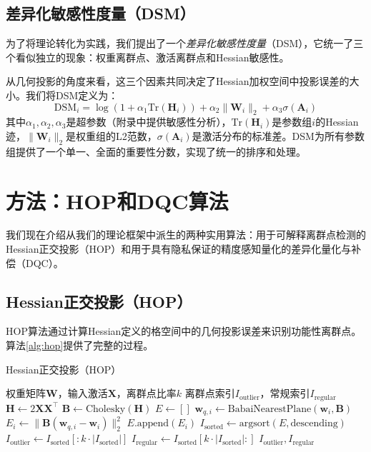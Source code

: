 \documentclass[letterpaper,twocolumn,10pt]{article}
\begin{document}
\subsection{差异化敏感性度量（DSM）}

为了将理论转化为实践，我们提出了一个\emph{差异化敏感性度量}（DSM），它统一了三个看似独立的现象：权重离群点、激活离群点和Hessian敏感性。

从几何投影的角度来看，这三个因素共同决定了Hessian加权空间中投影误差的大小。我们将DSM定义为：
\begin{equation}
\text{DSM}_i = \log(1 + \alpha_1 \text{Tr}(\mathbf{H}_i)) + \alpha_2 \|\mathbf{W}_i\|_2 + \alpha_3 \sigma(\mathbf{A}_i)
\label{eq:dsm}
\end{equation}
其中$\alpha_1, \alpha_2, \alpha_3$是超参数（附录中提供敏感性分析），$\text{Tr}(\mathbf{H}_i)$是参数组$i$的Hessian迹，$\|\mathbf{W}_i\|_2$是权重组的L2范数，$\sigma(\mathbf{A}_i)$是激活分布的标准差。DSM为所有参数组提供了一个单一、全面的重要性分数，实现了统一的排序和处理。

\section{方法：HOP和DQC算法}
\label{sec:method}

我们现在介绍从我们的理论框架中派生的两种实用算法：用于可解释离群点检测的Hessian正交投影（HOP）和用于具有隐私保证的精度感知量化的差异化量化与补偿（DQC）。

\subsection{Hessian正交投影（HOP）}

HOP算法通过计算Hessian定义的格空间中的几何投影误差来识别功能性离群点。算法\ref{alg:hop}提供了完整的过程。

\begin{algorithm}
\caption{Hessian正交投影（HOP）}
\label{alg:hop}
\begin{algorithmic}[1]
\REQUIRE 权重矩阵$\mathbf{W}$，输入激活$\mathbf{X}$，离群点比率$k$
\ENSURE 离群点索引$I_{\text{outlier}}$，常规索引$I_{\text{regular}}$
\STATE $\mathbf{H} \leftarrow 2\mathbf{X}\mathbf{X}^\top$ 
\STATE $\mathbf{B} \leftarrow \text{Cholesky}(\mathbf{H})$ 
\STATE $E \leftarrow []$ 
    \STATE $\mathbf{w}_{q,i} \leftarrow \text{BabaiNearestPlane}(\mathbf{w}_i, \mathbf{B})$
    \STATE $E_i \leftarrow \|\mathbf{B}(\mathbf{w}_{q,i} - \mathbf{w}_i)\|_2^2$ 
    \STATE $E.\text{append}(E_i)$
\ENDFOR
\STATE $I_{\text{sorted}} \leftarrow \text{argsort}(E, \text{descending})$
\STATE $I_{\text{outlier}} \leftarrow I_{\text{sorted}}[:k \cdot |I_{\text{sorted}}|]$
\STATE $I_{\text{regular}} \leftarrow I_{\text{sorted}}[k \cdot |I_{\text{sorted}}|:]$
\RETURN $I_{\text{outlier}}, I_{\text{regular}}$
\end{algorithmic}
\end{algorithm}
\end{document}
